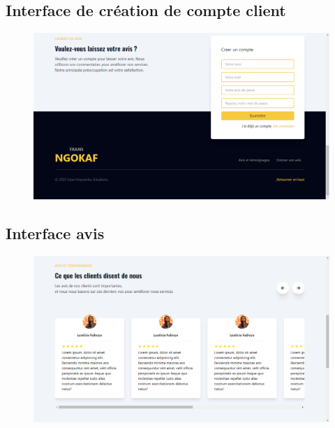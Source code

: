     \subsection[Interface de création de compte client]{Interface de création de compte client}
        \begin{figure}[H]
            \centering
            \includegraphics[width=130mm]{images/presentation-de-la-solution/creer-compte-client.png}
            \label{fig:mdSysteme}
        \end{figure}
    \subsection[Interface avis]{Interface avis}
        \begin{figure}[H]
            \centering
            \includegraphics[width=130mm]{images/presentation-de-la-solution/avis.png}
            \label{fig:mdSysteme}
        \end{figure}

